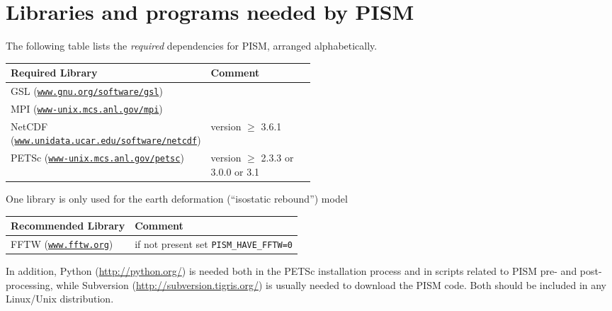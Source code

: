 \documentclass[11pt,final]{amsart}
\newcommand{\PETSCREL}{2.3.3 or 3.0.0 or 3.1}
\newcommand{\normalspacing}{\renewcommand{\baselinestretch}{1.1}\tiny\normalsize}
\renewcommand{\t}[1]{\texttt{#1}}
\begin{document}
\clearpage
\section{Libraries and programs needed by PISM}
\label{sec:prerequisites}

\bigskip
The following table lists the \emph{required} dependencies for PISM, arranged alphabetically.
\bigskip
\newcommand{\fattablespacing}{\renewcommand{\baselinestretch}{1.5}\tiny\normalsize}
\fattablespacing
\newcommand\pairstack[2]{#1 \quad (\small#2\normalsize)}
\begin{center}
\begin{tabular*}{1.0\linewidth}{lp{0.5\linewidth}}\toprule
  \textbf{Required Library} & \textbf{Comment} \\
  \midrule
  \pairstack{GSL}{\href{http://www.gnu.org/software/gsl/}{\t{www.gnu.org/software/gsl}}}  &  \\
  \pairstack{MPI}{\href{http://www-unix.mcs.anl.gov/mpi/}{\t{www-unix.mcs.anl.gov/mpi}}}  & \\
  \pairstack{NetCDF}{\href{http://www.unidata.ucar.edu/software/netcdf/}{\t{www.unidata.ucar.edu/software/netcdf}}}  & version $\ge$ 3.6.1\\
  \pairstack{PETSc}{\href{http://www-unix.mcs.anl.gov/petsc/petsc-as/}{\t{www-unix.mcs.anl.gov/petsc}}}  & version $\ge$ \PETSCREL \\
  \bottomrule
\end{tabular*}
\end{center}
\normalspacing\bigskip

\noindent One library is only used for the earth deformation (``isostatic rebound'') model
\bigskip
\fattablespacing
\begin{center}
\begin{tabular*}{1.0\linewidth}{ll}\toprule
  \textbf{Recommended Library} & \textbf{Comment} \\
  \midrule
  \pairstack{FFTW}{\href{http://www.fftw.org/}{\t{www.fftw.org}}}\hspace{1.9in} & if not present set \texttt{PISM_HAVE_FFTW=0}\\
  \bottomrule
\end{tabular*}
\end{center}
\normalspacing
\bigskip

\noindent In addition, Python (\url{http://python.org/}) is needed both in the PETSc installation process and in scripts related to PISM pre- and post-processing, while Subversion (\url{http://subversion.tigris.org/}) is usually needed to download the PISM code.  Both should be included in any Linux/Unix distribution.
\end{document}
